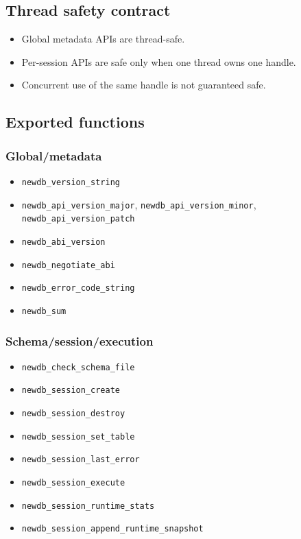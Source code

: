 \documentclass[11pt,a4paper]{article}
\begin{document}
\subsection{Thread safety contract}
\begin{itemize}
  \item Global metadata APIs are thread-safe.
  \item Per-session APIs are safe only when one thread owns one handle.
  \item Concurrent use of the same handle is not guaranteed safe.
\end{itemize}

\subsection{Exported functions}
\subsubsection*{Global/metadata}
\begin{itemize}
  \item \texttt{newdb\_version\_string}
  \item \texttt{newdb\_api\_version\_major}, \texttt{newdb\_api\_version\_minor},
  \texttt{newdb\_api\_version\_patch}
  \item \texttt{newdb\_abi\_version}
  \item \texttt{newdb\_negotiate\_abi}
  \item \texttt{newdb\_error\_code\_string}
  \item \texttt{newdb\_sum}
\end{itemize}

\subsubsection*{Schema/session/execution}
\begin{itemize}
  \item \texttt{newdb\_check\_schema\_file}
  \item \texttt{newdb\_session\_create}
  \item \texttt{newdb\_session\_destroy}
  \item \texttt{newdb\_session\_set\_table}
  \item \texttt{newdb\_session\_last\_error}
  \item \texttt{newdb\_session\_execute}
  \item \texttt{newdb\_session\_runtime\_stats}
  \item \texttt{newdb\_session\_append\_runtime\_snapshot}
\end{itemize}
\end{document}
